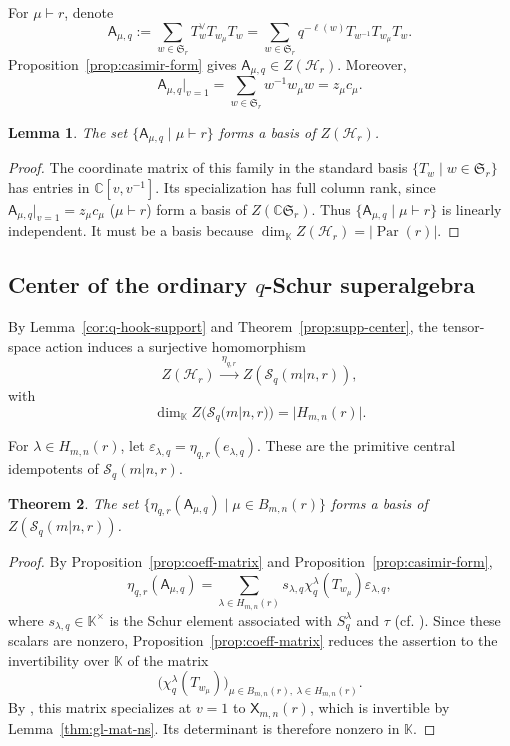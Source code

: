 \documentclass[11pt]{amsart}
\numberwithin{equation}{section}
\theoremstyle{plain}
\newtheorem{thm}{Theorem}[section]
\newtheorem{lem}[thm]{Lemma}
\theoremstyle{definition}
\theoremstyle{remark}
\begin{document}
For $\mu\vdash r$, denote
\begin{equation}\label{eq:gl-casimir}
\mathsf A_{\mu,q}
:=\sum_{w\in\mathfrak S_r}
T_w^\vee T_{w_\mu}T_w
=\sum_{w\in\mathfrak S_r}
q^{-\ell(w)}T_{w^{-1}}T_{w_\mu}T_w.
\end{equation}
Proposition~\ref{prop:casimir-form} gives
$\mathsf A_{\mu,q}\in Z(\mathcal H_r)$.
Moreover,
$$
\mathsf A_{\mu,q}\big|_{v=1}
=\sum_{w\in\mathfrak S_r}w^{-1}w_\mu w
=z_\mu c_\mu.
$$

\begin{lem}\label{lem:hecke-center-basis}
The set
$\{\mathsf A_{\mu,q}\mid\mu\vdash r\}$
forms a basis of $Z(\mathcal H_r)$.
\end{lem}

\begin{proof}
The coordinate matrix of this family in the standard basis
$\{T_w\mid w\in\mathfrak S_r\}$ has entries in $\mathbb C[v,v^{-1}]$.
Its specialization has full column rank, since
$\mathsf A_{\mu,q}\big|_{v=1}=z_\mu c_\mu$ ($\mu\vdash r$) form a basis
of $Z(\mathbb C\mathfrak S_r)$.
Thus $\{\mathsf A_{\mu,q}\mid\mu\vdash r\}$ is
linearly independent.
It must be a basis because
$\dim_{\mathbb K} Z(\mathcal H_r)=|\operatorname{Par}(r)|$.
\end{proof}


\subsection{Center of the ordinary \texorpdfstring{$q$}{q}-Schur superalgebra}
By Lemma~\ref{cor:q-hook-support} and
Theorem~\ref{prop:supp-center}, the tensor-space action
induces a surjective homomorphism
$$
Z(\mathcal H_r)
\xrightarrow{\ \eta_{q,r}\ }
Z(\mathcal S_q(m|n,r)),
$$
with
$$
\dim_{\mathbb K} Z(\mathcal S_q(m|n,r))
=
|H_{m,n}(r)|.
$$

For $\lambda\in H_{m,n}(r)$, let
$\varepsilon_{\lambda,q}=\eta_{q,r}(e_{\lambda,q})$.
These are the primitive central idempotents of $\mathcal S_q(m|n,r)$.


\begin{thm}\label{thm:gl-center-bases}
The set
$\{\eta_{q,r}(\mathsf A_{\mu,q})\mid\mu\in B_{m,n}(r)\}$
forms a basis of $Z(\mathcal S_q(m|n,r))$.
\end{thm}

\begin{proof}
By Proposition~\ref{prop:coeff-matrix} and Proposition~\ref{prop:casimir-form},
$$
\eta_{q,r}(\mathsf A_{\mu,q})
=
\sum_{\lambda\in H_{m,n}(r)}
s_{\lambda,q}\chi_q^\lambda(T_{w_\mu})\varepsilon_{\lambda,q},
$$
where $s_{\lambda,q}\in \mathbb K^\times$ is the Schur element associated
with $S_q^\lambda$ and $\tau$ (cf. \cite[\S2.3]{WW15}).
Since these scalars are nonzero, Proposition~\ref{prop:coeff-matrix}
reduces the assertion to the invertibility over $\mathbb K$ of the matrix
$$
\bigl(\chi_q^\lambda(T_{w_\mu})\bigr)_{
\mu\in B_{m,n}(r),\ \lambda\in H_{m,n}(r)}.
$$
By \cite[\S2.1]{WW15}, this matrix specializes at $v=1$ to
$\mathsf X_{m,n}(r)$, which is invertible by
Lemma~\ref{thm:gl-mat-ns}.
Its determinant is therefore nonzero in $\mathbb{K}$.
\end{proof}
\end{document}
